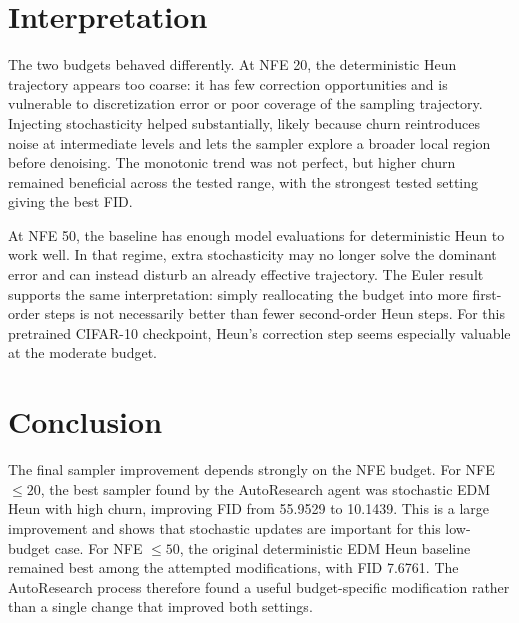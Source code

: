 \documentclass[11pt]{article}
\begin{document}
\section{Interpretation}

The two budgets behaved differently. At NFE 20, the deterministic Heun trajectory appears too coarse: it has few correction opportunities and is vulnerable to discretization error or poor coverage of the sampling trajectory. Injecting stochasticity helped substantially, likely because churn reintroduces noise at intermediate levels and lets the sampler explore a broader local region before denoising. The monotonic trend was not perfect, but higher churn remained beneficial across the tested range, with the strongest tested setting giving the best FID.

At NFE 50, the baseline has enough model evaluations for deterministic Heun to work well. In that regime, extra stochasticity may no longer solve the dominant error and can instead disturb an already effective trajectory. The Euler result supports the same interpretation: simply reallocating the budget into more first-order steps is not necessarily better than fewer second-order Heun steps. For this pretrained CIFAR-10 checkpoint, Heun's correction step seems especially valuable at the moderate budget.

\section{Conclusion}

The final sampler improvement depends strongly on the NFE budget. For NFE $\leq 20$, the best sampler found by the AutoResearch agent was stochastic EDM Heun with high churn, improving FID from 55.9529 to 10.1439. This is a large improvement and shows that stochastic updates are important for this low-budget case. For NFE $\leq 50$, the original deterministic EDM Heun baseline remained best among the attempted modifications, with FID 7.6761. The AutoResearch process therefore found a useful budget-specific modification rather than a single change that improved both settings.
\end{document}
